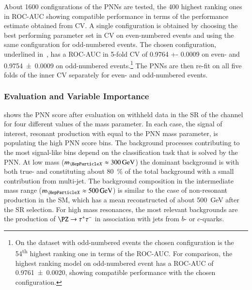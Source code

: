 About 1600 configurations of the PNNs are tested, the 400 highest ranking ones
in ROC-AUC showing compatible performance in terms of the performance estimate
obtained from CV. A single configuration is obtained by choosing the best
performing parameter set in CV on even-numbered events and using the same
configuration for odd-numbered events. The chosen configuration, underlined
in~, has a ROC-AUC in 5-fold CV of \num{0.9764
  +- 0.0009} on even- and \num{0.9754 +- 0.0009} on odd-numbered
events.\footnote{On the dataset with odd-numbered events the chosen
  configuration is the 54\textsuperscript{th} highest ranking one in terms of
  the ROC-AUC. For comparison, the highest ranking model on odd-numbered event
  has a ROC-AUC of \num{0.9761 +- 0.0020}, showing compatible performance with
  the chosen configuration.} The PNNs are then re-fit on all five folds of the
inner CV separately for even- and odd-numbered events.

\subsubsection{Evaluation and Variable Importance}

 shows the PNN score after evaluation on
withheld data in the SR of the \hadhad channel for four
different values of the mass parameter. In each case, the signal of
interest, resonant \HH production with \mX equal to the PNN mass
parameter, is populating the high PNN score bins. The background
processes contributing to the most signal-like bins depend on the
classification task that is solved by the PNN. At low mass
($\mX \approx \SI{300}{\GeV}$) the dominant background is \ttbar with
both true- and \faketauhadvis constituting about \SI{80}{\percent} of
the total background with a small contribution from multi-jet.  The
background composition in the intermediate mass range
($\mX \approx \SI{500}{\GeV}$) is similar to the case of non-resonant
\HH production in the SM, which has a mean reconstructed \mHH of about
\SI{500}{\GeV} after the SR selection. For high mass
resonances, the most relevant backgrounds are the production of
$\PZ \to \tautau$ in association with jets from $b$- or $c$-quarks.

